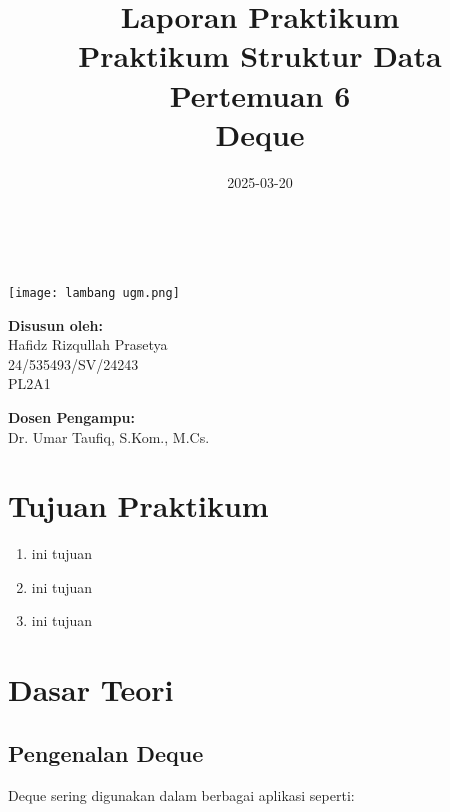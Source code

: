 \documentclass[a4paper,oneside,12pt]{book}
\title{Laporan Praktikum \\ Praktikum Struktur Data \\ Pertemuan 6 \\ Deque}
\date{2025-03-20}
\begin{document}
\begin{titlingpage}
\begin{center}
\vspace{4cm}
\begin{huge}
\textbf{\thetitle} \\
\end{huge}
\vspace{1cm}
\texttt{[image: lambang ugm.png]} \\
\vspace{1cm}
\begin{Large}
\textbf{Disusun oleh:} \\
\vspace{0.5cm}
Hafidz Rizqullah Prasetya \\
24/535493/SV/24243 \\
PL2A1 \\
\end{Large}
\vspace{1cm}
\begin{Large}
\textbf{Dosen Pengampu:} \\
\vspace{0.5cm}
Dr. Umar Taufiq, S.Kom., M.Cs. \\
\end{Large}
\vspace{1cm}
\thedate
\end{center}
\end{titlingpage}
\restoregeometry

\tableofcontents
\newpage

\chapter*{Tujuan Praktikum}
\begin{enumerate}
\item ini tujuan
\item ini tujuan
\item ini tujuan
\end{enumerate}

\chapter*{Dasar Teori}
\setcounter{chapter}{2}
\setcounter{section}{0}
\section{Pengenalan Deque}
Deque sering digunakan dalam berbagai aplikasi seperti:
\end{document}
